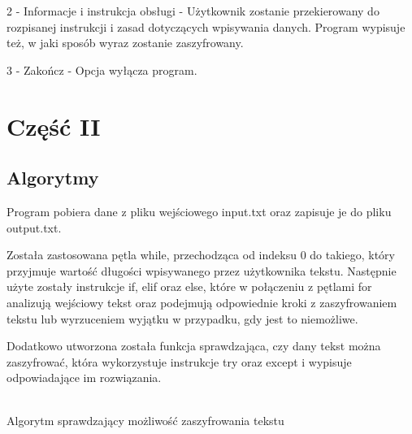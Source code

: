 \documentclass[12pt,a4paper]{article}
\begin{document}
        2 - Informacje i instrukcja obsługi - Użytkownik zostanie przekierowany do rozpisanej instrukcji i zasad dotyczących wpisywania danych. Program wypisuje też, w jaki sposób wyraz zostanie zaszyfrowany.

        3 - Zakończ - Opcja wyłącza program.
	


        \newpage
	\section*{Część II}
	\subsection*{Algorytmy}
	\hspace{0.5cm} Program pobiera dane z pliku wejściowego               input.txt oraz zapisuje je do pliku output.txt.
 
         Została zastosowana pętla while, przechodząca od indeksu 0      do takiego, który przyjmuje wartość długości wpisywanego przez użytkownika tekstu. Następnie użyte zostały instrukcje if, elif oraz else, które w połączeniu z pętlami for analizują wejściowy tekst oraz podejmują odpowiednie kroki z zaszyfrowaniem tekstu lub wyrzuceniem wyjątku w przypadku, gdy jest to niemożliwe.

        Dodatkowo utworzona została funkcja sprawdzająca, czy dany tekst można zaszyfrować, która wykorzystuje instrukcje try oraz except i wypisuje odpowiadające im rozwiązania.\\
        \\
        \begin{algorithm}[H]
            
            \caption{Algorytm sprawdzający możliwość zaszyfrowania tekstu}
        \end{algorithm}
        
\end{document}
